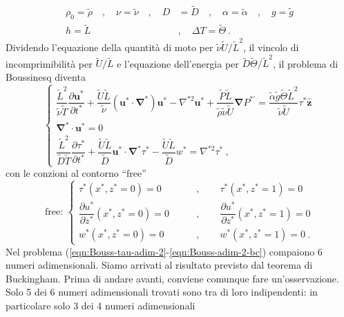 \begin{equation}\label{eqn:var-adim-2}
\begin{aligned}
    \rho_0 = \tilde{\rho} \quad  , \quad \nu = \tilde{\nu} \quad , \quad D & = \tilde{D}  \quad , \quad \alpha = \tilde{\alpha}  \quad , \quad g = \tilde{g}  \\
    h = \tilde{L}  \quad & , \quad \Delta T = \tilde{\Theta}  \ .
\end{aligned}
\end{equation}
Dividendo l'equazione della quantità di moto per $\tilde{\nu}\tilde{U}/\tilde{L}^2$, il vincolo di incomprimibilità per $\tilde{U}/\tilde{L}$ e l'equazione dell'energia per $\tilde{D}\tilde{\Theta}/\tilde{L}^2$, il problema di Boussinesq diventa
\begin{equation}\label{eqn:Bouss-tau-adim-2}
    \begin{cases}
      \dfrac{\tilde{L}^2}{\tilde{\nu}\tilde{T}}\dfrac{\partial \bm{u}^*}{\partial t^*} + \dfrac{\tilde{U}\tilde{L}}{\tilde{\nu}}
      \left( \bm{u}^* \cdot \bm{\nabla}^* \right) \bm{u}^* -
      \nabla^{*2} \bm{u}^* + \dfrac{\tilde{P}\tilde{L}}{\tilde{\rho} \tilde{\nu} \tilde{U}}\bm{\nabla} P^{*'} = \dfrac{\tilde{\alpha} \tilde{g} \tilde{\Theta} \tilde{L}^2}{\tilde{\nu} \tilde{U}} \tau^* \bm{\hat{z}} \\
      \bm{\nabla}^* \cdot \bm{u}^* = 0 \\
      \dfrac{\tilde{L}^2}{\tilde{D}\tilde{T}}\dfrac{\partial \tau^*}{\partial t^*} + \dfrac{\tilde{U}\tilde{L}}{\tilde{D}}\bm{u}^* \cdot 
      \bm{\nabla}^* \tau^* - \dfrac{\tilde{U}\tilde{L}}{\tilde{D}} w^* = \nabla^{*2} \tau^* \ ,
    \end{cases}
\end{equation}
con le conzioni al contorno ``free''
\begin{equation}\label{eqn:Bouss-adim-2-bc}
    \text{free: }
    \left\{
    \begin{aligned}
      \tau^*(x^*,z^*=0) = 0 \qquad  & , \qquad 
      \tau^*(x^*,z^*=1) = 0 \\
      \dfrac{\partial u^*}{\partial z^*}(x^*,z^*=0) = 0 \qquad & , \qquad 
      \dfrac{\partial u^*}{\partial z^*}(x^*,z^*=1) = 0 \\
      w^*(x^*,z^*=0) = 0 \qquad & , \qquad w^*(x^*,z^*=1) = 0 \ .
    \end{aligned} \right.
\end{equation}
Nel problema (\ref{eqn:Bouss-tau-adim-2}-\ref{eqn:Bouss-adim-2-bc}) compaiono 6 numeri adimensionali. Siamo arrivati al risultato previsto dal teorema di Buckingham. Prima di andare avanti, conviene comunque fare un'osservazione. Solo 5 dei 6 numeri adimensionali trovati sono tra di loro indipendenti: in particolare solo 3 dei 4 numeri adimensionali
